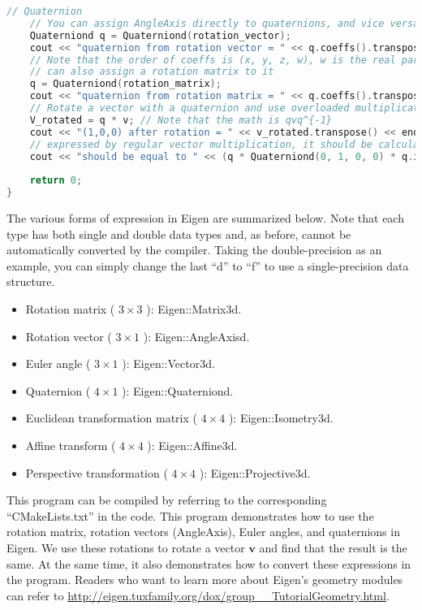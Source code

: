 \begin{lstlisting}[language=c++,caption=slambook2/ch3/useGeometry/useGeometry.cpp]
	// Quaternion
	// You can assign AngleAxis directly to quaternions, and vice versa
	Quaterniond q = Quaterniond(rotation_vector);
	cout << "quaternion from rotation vector = " << q.coeffs().transpose() << endl; 
	// Note that the order of coeffs is (x, y, z, w), w is the real part, the first three are the imaginary part
	// can also assign a rotation matrix to it
	q = Quaterniond(rotation_matrix);
	cout << "quaternion from rotation matrix = " << q.coeffs().transpose() << endl;
	// Rotate a vector with a quaternion and use overloaded multiplication
	V_rotated = q * v; // Note that the math is qvq^{-1}
	cout << "(1,0,0) after rotation = " << v_rotated.transpose() << endl;
	// expressed by regular vector multiplication, it should be calculated as follows
	cout << "should be equal to " << (q * Quaterniond(0, 1, 0, 0) * q.inverse()).coeffs().transpose() << endl;
	
	return 0;
}
\end{lstlisting}

The various forms of expression in Eigen are summarized below. Note that each type has both single and double data types and, as before, cannot be automatically converted by the compiler. Taking the double-precision as an example, you can simply change the last ``d'' to ``f'' to use a single-precision data structure.
\begin{itemize}
	\item Rotation matrix ( $ 3  \times  3 $ ): Eigen::Matrix3d.
	\item Rotation vector ( $ 3  \times  1 $ ): Eigen::AngleAxisd.
	\item Euler angle ( $ 3  \times  1 $ ): Eigen::Vector3d.
	\item Quaternion ( $ 4  \times  1 $ ): Eigen::Quaterniond.
	\item Euclidean transformation matrix ( $ 4  \times  4 $ ): Eigen::Isometry3d.
	\item Affine transform ( $ 4  \times  4 $ ): Eigen::Affine3d.
	\item Perspective transformation ( $ 4  \times  4 $ ): Eigen::Projective3d.
\end{itemize}

This program can be compiled by referring to the corresponding ``CMakeLists.txt'' in the code. This program demonstrates how to use the rotation matrix, rotation vectors (AngleAxis), Euler angles, and quaternions in Eigen. We use these rotations to rotate a vector $ \mathbf {v} $ and find that the result is the same. At the same time, it also demonstrates how to convert these expressions in the program. Readers who want to learn more about Eigen's geometry modules can refer to \url {http://eigen.tuxfamily.org/dox/group__TutorialGeometry.html}.

